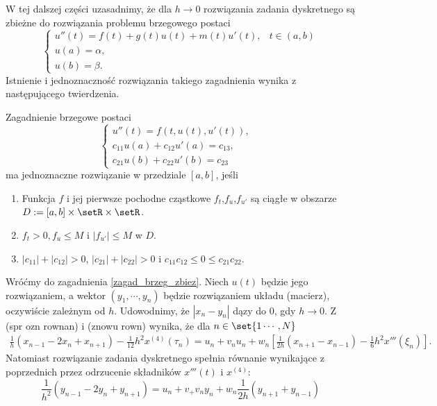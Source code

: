W tej dalszej części uzasadnimy, że dla $h \to 0$ rozwiązania zadania dyskretnego są zbieżne do rozwiązania problemu brzegowego postaci
\begin{equation}\label{zagad_brzeg_zbiez}
\left\{\begin{array}{cl}
u''(t) = f(t) + g(t) u(t) + m(t) u'(t), &  t \in (a,b)\\
u(a) = \alpha, & \\
u(b) = \beta.
\end{array}\right.
\end{equation}
Istnienie i jednoznaczność rozwiązania takiego zagadnienia wynika z następującego twierdzenia.
\begin{theorem}
Zagadnienie brzegowe postaci
\begin{equation}
\left\{\begin{array}{cl}
u''(t) = f(t,u(t),u'(t)), & \\
c_{11}u(a) + c_{12}u'(a) = c_{13}, & \\
c_{21}u(b) + c_{22}u'(b) = c_{23}
\end{array}\right.
\end{equation}
ma jednoznaczne rozwiązanie w przedziale $[a,b]$, jeśli
\begin{enumerate}
\item Funkcja $f$ i jej pierwsze pochodne cząstkowe $f_t$,$f_u$,$f_{u'}$ są ciągłe w obszarze $D:= [a,b] \times \setR \times \setR$.
\item $f_t >0, f_u \leq M$ i $|f_{u'}| \leq M$ w $D$.
\item $|c_{11}| + |c_{12}| > 0$, $|c_{21}| + |c_{22}| >0$ i $c_{11}c_{12}\leq 0 \leq c_{21}c_{22}$.
\end{enumerate}
\end{theorem}
Wróćmy do zagadnienia \eqref{zagad_brzeg_zbiez}. Niech $u(t)$ będzie jego rozwiązaniem, a wektor $(y_1,\cdots,y_n)$ będzie rozwiązaniem układu (macierz), oczywiście zależnym od $h$. Udowodnimy, że $|x_n - y_n|$ dązy do $0$, gdy $h \to 0$. Z (spr ozn rownan) i (znowu rown) wynika, że dla $ n \in \set{1\cdots,N}$
$$
\begin{array}{cl}
\frac{1}{h} (x_{n-1} - 2x_n + x_{n+1}) - \frac{1}{12}h^2x^{(4)}(\tau_{n}) = u_n + v_nu_n + w_n\left[\frac{1}{2h}(x_{n+1} - x_{n-1}) - \frac{1}{6}h^2x'''(\xi_n)\right].
\end{array}
$$
Natomiast rozwiązanie zadania dyskretnego spełnia równanie wynikające z poprzednich przez odrzucenie składników $x'''(t)$ i $x^{(4)}$:
$$
\frac{1}{h^2}(y_{n-1} -2y_n + y_{n+1})= u_n+v_+v_ny_n + w_n\frac{1}{2h} (y_{n+1}+y_{n-1})
$$
